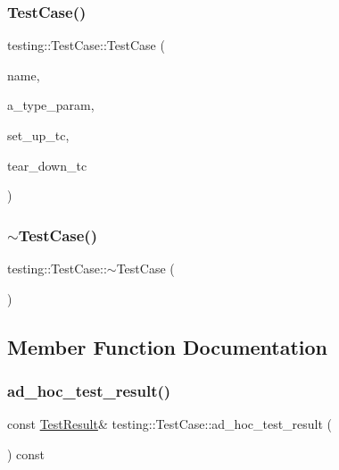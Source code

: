 \subsubsection{\texorpdfstring{TestCase()}{TestCase()}}
{\footnotesize\ttfamily testing\+::\+Test\+Case\+::\+Test\+Case (\begin{DoxyParamCaption}\item[{const char $\ast$}]{name,  }\item[{const char $\ast$}]{a\+\_\+type\+\_\+param,  }\item[{\mbox{\hyperlink{classtesting_1_1Test_a5f2a051d1d99c9b784c666c586186cf9}{Test\+::\+Set\+Up\+Test\+Case\+Func}}}]{set\+\_\+up\+\_\+tc,  }\item[{\mbox{\hyperlink{classtesting_1_1Test_aa0f532e93b9f3500144c53f31466976c}{Test\+::\+Tear\+Down\+Test\+Case\+Func}}}]{tear\+\_\+down\+\_\+tc }\end{DoxyParamCaption})}

\mbox{\label{classtesting_1_1TestCase_a96ab68dd1f8f64a7087ac34ff64a2e46}} 
\subsubsection{\texorpdfstring{$\sim$TestCase()}{~TestCase()}}
{\footnotesize\ttfamily testing\+::\+Test\+Case\+::$\sim$\+Test\+Case (\begin{DoxyParamCaption}{ }\end{DoxyParamCaption})\hspace{0.3cm}{\ttfamily [virtual]}}



\subsection{Member Function Documentation}
\mbox{\label{classtesting_1_1TestCase_a6d5fc5003bc3352f3ddae7dadc6d2364}} 
\subsubsection{\texorpdfstring{ad\_hoc\_test\_result()}{ad\_hoc\_test\_result()}}
{\footnotesize\ttfamily const \mbox{\hyperlink{classtesting_1_1TestResult}{Test\+Result}}\& testing\+::\+Test\+Case\+::ad\+\_\+hoc\+\_\+test\+\_\+result (\begin{DoxyParamCaption}{ }\end{DoxyParamCaption}) const\hspace{0.3cm}{\ttfamily [inline]}}


